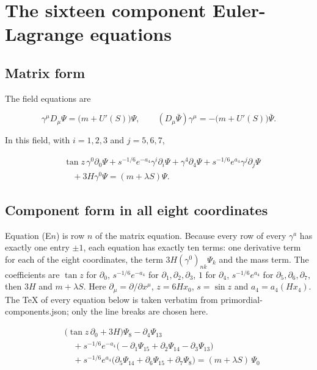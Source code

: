 \documentclass[11pt]{article}
\begin{document}
\section{The sixteen component Euler-Lagrange equations}

\subsection{Matrix form}

The field equations are

\[
\gamma^\mu D_\mu\Psi=\bigl(m+U'(S)\bigr)\Psi,\qquad (D_\mu\bar\Psi)\gamma^\mu=-\bigl(m+U'(S)\bigr)\bar\Psi .
\]

In this field, with $i=1,2,3$ and $j=5,6,7$,

\[
\begin{aligned}
&\tan z\,\gamma^0\partial_0\Psi+s^{-1/6}e^{-a_4}\gamma^i\partial_i\Psi+\gamma^4\partial_4\Psi+s^{-1/6}e^{a_4}\gamma^j\partial_j\Psi \\
&\quad+3H\gamma^0\Psi=(m+\lambda S)\Psi .
\end{aligned}
\]

\subsection{Component form in all eight coordinates}

Equation (E$n$) is row $n$ of the matrix equation. Because every row of every $\gamma^a$ has exactly one entry $\pm1$, each equation has exactly ten terms: one derivative term for each of the eight coordinates, the term $3H(\gamma^0)_{nk}\Psi_k$ and the mass term. The coefficients are $\tan z$ for $\partial_0$, $s^{-1/6}e^{-a_4}$ for $\partial_1,\partial_2,\partial_3$, $1$ for $\partial_4$, $s^{-1/6}e^{a_4}$ for $\partial_5,\partial_6,\partial_7$, then $3H$ and $m+\lambda S$. Here $\partial_\mu=\partial/\partial x^\mu$, $z=6Hx_0$, $s=\sin z$ and $a_4=a_4(Hx_4)$. The TeX of every equation below is taken verbatim from primordial-components.json; only the line breaks are chosen here.

\[
\begin{aligned}
&\bigl(\tan z\,\partial_{0}+3H\bigr)\Psi_{8}-\partial_{4}\Psi_{13} \\
&\quad +s^{-1/6}e^{-a_4}\bigl(-\partial_{1}\Psi_{15}+\partial_{2}\Psi_{14}-\partial_{3}\Psi_{13}\bigr) \\
&\quad +s^{-1/6}e^{a_4}\bigl(\partial_{5}\Psi_{14}+\partial_{6}\Psi_{15}+\partial_{7}\Psi_{8}\bigr)=(m+\lambda S)\,\Psi_{0}
\end{aligned}\tag{E0}
\]
\end{document}
